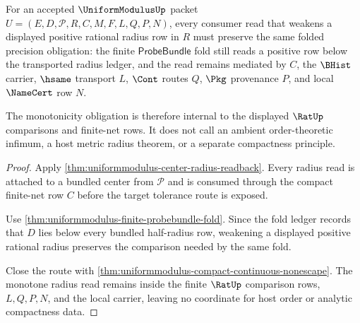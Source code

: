 \begin{theorem}
\label{thm:uniformmodulus-radius-monotonicity-obligation}
For an accepted $\UniformModulusUp$ packet $U=(E,D,\mathcal{P},R,C,M,F,L,Q,P,N)$, every consumer read that weakens a displayed positive rational radius row in $R$ must preserve the same folded precision obligation: the finite $\mathsf{ProbeBundle}$ fold still reads a positive row below the transported radius ledger, and the read remains mediated by $C$, the $\BHist$ carrier, $\hsame$ transport $L$, $\Cont$ routes $Q$, $\Pkg$ provenance $P$, and local $\NameCert$ row $N$.

The monotonicity obligation is therefore internal to the displayed $\RatUp$ comparisons and finite-net rows. It does not call an ambient order-theoretic infimum, a host metric radius theorem, or a separate compactness principle.
\end{theorem}
\begin{proof}
Apply \autoref{thm:uniformmodulus-center-radius-readback}. Every radius read is attached to a bundled center from $\mathcal{P}$ and is consumed through the compact finite-net row $C$ before the target tolerance route is exposed.

Use \autoref{thm:uniformmodulus-finite-probebundle-fold}. Since the fold ledger records that $D$ lies below every bundled half-radius row, weakening a displayed positive rational radius preserves the comparison needed by the same fold.

Close the route with \autoref{thm:uniformmodulus-compact-continuous-nonescape}. The monotone radius read remains inside the finite $\RatUp$ comparison rows, $L,Q,P,N$, and the local carrier, leaving no coordinate for host order or analytic compactness data.
\end{proof}

